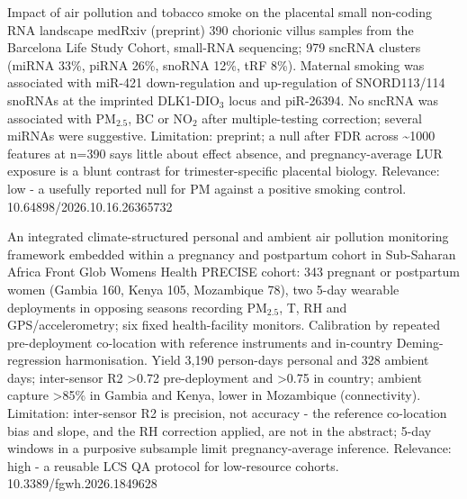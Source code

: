 \documentclass[10pt]{article}
\begin{document}
{Impact of air pollution and tobacco smoke on the placental small non-coding RNA landscape}
{medRxiv (preprint)}
{390 chorionic villus samples from the Barcelona Life Study Cohort, small-RNA sequencing; 979 sncRNA clusters (miRNA 33\%, piRNA 26\%, snoRNA 12\%, tRF 8\%). Maternal smoking was associated with miR-421 down-regulation and up-regulation of SNORD113/114 snoRNAs at the imprinted DLK1-DIO$_3$ locus and piR-26394. No sncRNA was associated with PM$_{2.5}$, BC or NO$_2$ after multiple-testing correction; several miRNAs were suggestive. Limitation: preprint; a null after FDR across \textasciitilde{}1000 features at n=390 says little about effect absence, and pregnancy-average LUR exposure is a blunt contrast for trimester-specific placental biology. Relevance: low - a usefully reported null for PM against a positive smoking control.}
{10.64898/2026.10.16.26365732}

\par{}\baselineskip{}\baselineskip
{}

{An integrated climate-structured personal and ambient air pollution monitoring framework embedded within a pregnancy and postpartum cohort in Sub-Saharan Africa}
{Front Glob Womens Health}
{PRECISE cohort: 343 pregnant or postpartum women (Gambia 160, Kenya 105, Mozambique 78), two 5-day wearable deployments in opposing seasons recording PM$_{2.5}$, T, RH and GPS/accelerometry; six fixed health-facility monitors. Calibration by repeated pre-deployment co-location with reference instruments and in-country Deming-regression harmonisation. Yield 3,190 person-days personal and 328 ambient days; inter-sensor R2 >0.72 pre-deployment and >0.75 in country; ambient capture >85\% in Gambia and Kenya, lower in Mozambique (connectivity). Limitation: inter-sensor R2 is precision, not accuracy - the reference co-location bias and slope, and the RH correction applied, are not in the abstract; 5-day windows in a purposive subsample limit pregnancy-average inference. Relevance: high - a reusable LCS QA protocol for low-resource cohorts.}
{10.3389/fgwh.2026.1849628}
\end{document}
